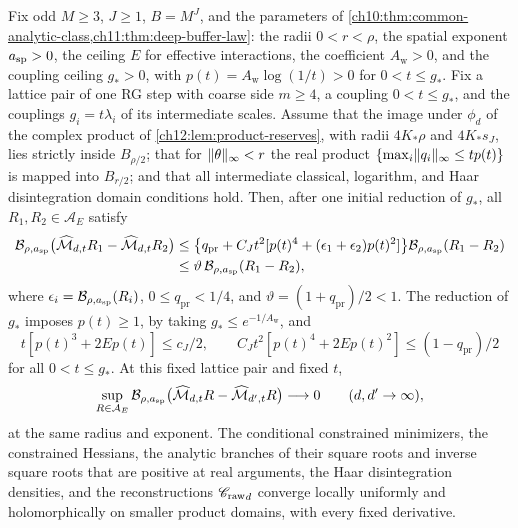 \begin{theorem}\label{ch12:thm:fixed-resolution-cutoff}
Fix odd $M\ge3$, $J\ge1$, $B=M^J$, and the parameters of \cref{ch10:thm:common-analytic-class,ch11:thm:deep-buffer-law}: the radii $0<r<\rho$, the spatial exponent $a_{\mathrm{sp}}>0$, the ceiling $E$ for effective interactions, the coefficient $A_{\mathrm w}>0$, and the coupling ceiling $g_*>0$, with $p(t)=A_{\mathrm w}\log(1/t)>0$ for $0<t\le g_*$. Fix a lattice pair of one RG step with coarse side $m\ge4$, a coupling $0<t\le g_*$, and the couplings $g_i=t\lambda_i$ of its intermediate scales. Assume that the image under $\phi_d$ of the complex product of \cref{ch12:lem:product-reserves}, with radii $4K_*\rho$ and $4K_*s_J$, lies strictly inside $B_{\rho/2}$; that for $\lVert \theta\rVert_\infty<r$ the real product $\{\max_i\lVert q_i\rVert_\infty\le tp(t)\}$ is mapped into $B_{r/2}$; and that all intermediate classical, logarithm, and Haar disintegration domain conditions hold. Then, after one initial reduction of $g_*$, all $R_1,R_2\in\mathcal A_E$ satisfy
\begin{align*}
 \mathcal B_{\rho,a_{\mathrm{sp}}}\bigl(\widehat{\mathcal M}_{d,t}R_1-\widehat{\mathcal M}_{d,t}R_2\bigr)
 &\le\bigl\{q_{\mathrm{pr}}+C_Jt^2[p(t)^4+(\epsilon_1+\epsilon_2)p(t)^2]\bigr\}
 \mathcal B_{\rho,a_{\mathrm{sp}}}(R_1-R_2)\\
 &\le\vartheta\,\mathcal B_{\rho,a_{\mathrm{sp}}}(R_1-R_2),
\end{align*}
where $\epsilon_i=\mathcal B_{\rho,a_{\mathrm{sp}}}(R_i)$, $0\le q_{\mathrm{pr}}<1/4$, and $\vartheta=(1+q_{\mathrm{pr}})/2<1$. The reduction of $g_*$ imposes $p(t)\ge1$, by taking $g_*\le e^{-1/A_{\mathrm w}}$, and
\[
 t[p(t)^3+2Ep(t)]\le c_J/2,\qquad C_Jt^2[p(t)^4+2Ep(t)^2]\le(1-q_{\mathrm{pr}})/2
\]
for all $0<t\le g_*$. At this fixed lattice pair and fixed $t$,
\[
 \sup_{R\in\mathcal A_E}\mathcal B_{\rho,a_{\mathrm{sp}}}\bigl(\widehat{\mathcal M}_{d,t}R-\widehat{\mathcal M}_{d',t}R\bigr)\longrightarrow0\qquad(d,d'\to\infty),
\]
at the same radius and exponent. The conditional constrained minimizers, the constrained Hessians, the analytic branches of their square roots and inverse square roots that are positive at real arguments, the Haar disintegration densities, and the reconstructions ${\mathscr C_{\mathrm{raw}}}_d$ converge locally uniformly and holomorphically on smaller product domains, with every fixed derivative.


\end{theorem}
